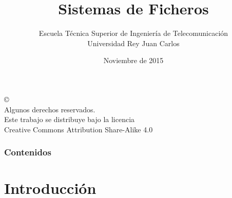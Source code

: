 \documentclass[ucs]{beamer}
\begin{document}
\title[Sistemas de Ficheros]{Sistemas de Ficheros}

\author[GSyC]{Escuela Técnica Superior de Ingeniería de Telecomunicación\\
Universidad Rey Juan Carlos}
\date[2015]{Noviembre de 2015}



\begin{frame}
  \titlepage
\end{frame}



\begin{frame}[b]
\begin{flushright}
{\tiny
\copyright \insertshortdate~\insertshortauthor \\
  Algunos derechos reservados. \\
  Este trabajo se distribuye bajo la licencia \\
  Creative Commons Attribution Share-Alike 4.0\\
}
\end{flushright}  
\end{frame}



\begin{frame}
  \frametitle{Contenidos}

  \tableofcontents

\end{frame}


\section{Introducción}
\end{document}
